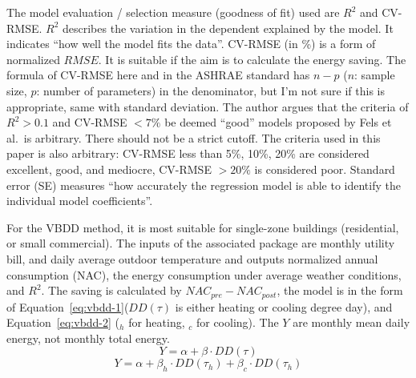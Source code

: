 \documentclass[12pt]{article}
\newcommand{\eref}[1]{Equation~\ref{#1}}
\begin{document}
The model evaluation / selection measure (goodness of fit) used are
$R^2$ and CV-RMSE. $R^2$ describes the variation in the dependent
explained by the model. It indicates ``how well the model fits the
data''. CV-RMSE (in \%) is a form of normalized $RMSE$. It is suitable
if the aim is to calculate the energy saving. The formula of CV-RMSE
here and in the ASHRAE standard has $n - p$ ($n$: sample size, $p$:
number of parameters) in the denominator, but I'm not sure if this is
appropriate, same with standard deviation. The author argues that the
criteria of $R^2 >0.1$ and CV-RMSE $< 7\%$ be deemed ``good'' models
proposed by Fels et al.\ is arbitrary. There should not be a strict
cutoff. The criteria used in this paper is also arbitrary: CV-RMSE
less than 5\%, 10\%, 20\% are considered excellent, good, and mediocre,
CV-RMSE $> 20\%$ is considered poor. Standard error (SE) measures
``how accurately the regression model is able to identify the
individual model coefficients''.

For the VBDD method, it is most suitable for single-zone buildings
(residential, or small commercial). The inputs of the associated
package are monthly utility bill, and daily average outdoor
temperature and outputs normalized annual consumption (NAC), the
energy consumption under average weather conditions, and $R^2$. The
saving is calculated by $NAC_{pre} - NAC_{post}$, the model is in the
form of \eref{eq:vbdd-1}($DD(\tau)$ is either heating or cooling
degree day), and \eref{eq:vbdd-2} ($_h$ for heating, $_c$ for
cooling). The $Y$ are monthly mean daily energy, not monthly total
energy.
\begin{equation}
  \label{eq:vbdd-1}
    Y = \alpha + \beta \cdot DD(\tau)
\end{equation}
\begin{equation}
  \label{eq:vbdd-2}
    Y = \alpha + \beta_h \cdot DD(\tau_h) + \beta_c \cdot DD(\tau_h)
\end{equation}
\end{document}
